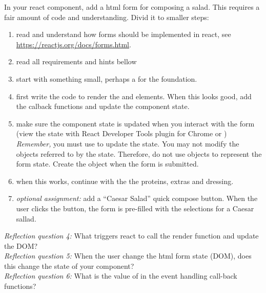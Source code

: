 \documentclass[fleqn, article, a4paper]{memoir}
\begin{document}
\begin{Assignments}
\item In your  react component, add a html form for composing a salad. This requires a fair amount of code and understanding. Divid it to smaller steps:
\begin{enumerate}
  \item read and understand how forms should be implemented in react, see \url{https://reactjs.org/docs/forms.html}.
  \item read all requirements and hints bellow
  \item start with something small, perhaps a  for the foundation.
  \item first write the code to render the  and  elements. When this looks good, add the calback functions and update the component state.
  \item make sure the component state is updated when you interact with the form (view the state with React Developer Tools plugin for Chrome or ) \emph{Remember,} you must use  to update the state. You may not modify the objects referred to by the state. Therefore, do not use  objects to represent the form state. Create the  object when the form is submitted.
  \item when this works, continue with the the proteins, extras and dressing.
  \item \emph{optional assignment:} add a ``Caesar Salad'' quick compose button. When the user clicks the button, the form is pre-filled with the selections for a Caesar sallad.
\end{enumerate}
\emph{Reflection question 4:} What triggers react to call the render function and update the DOM?
\\\emph{Reflection question 5:} When the user change the html form state (DOM), does this change the state of your component?
\\\emph{Reflection question 6:} What is the value of  in the event handling call-back functions?


\end{Assignments}
\end{document}
